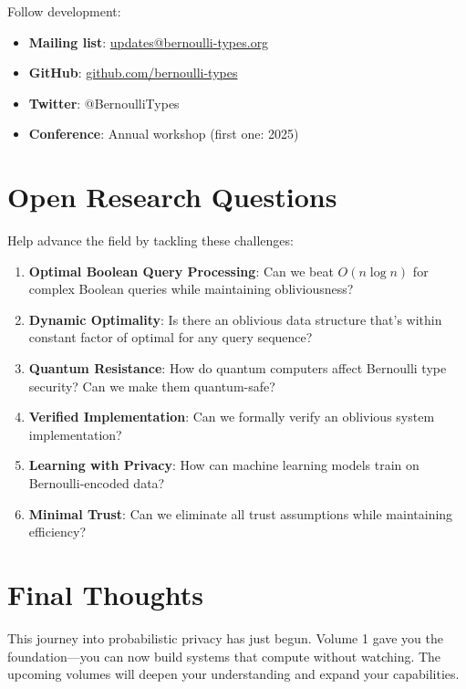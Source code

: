 Follow development:
\begin{itemize}
\item \textbf{Mailing list}: \url{updates@bernoulli-types.org}
\item \textbf{GitHub}: \url{github.com/bernoulli-types}
\item \textbf{Twitter}: @BernoulliTypes
\item \textbf{Conference}: Annual workshop (first one: 2025)
\end{itemize}

\section{Open Research Questions}

Help advance the field by tackling these challenges:

\begin{enumerate}
\item \textbf{Optimal Boolean Query Processing}: Can we beat $O(n \log n)$ for complex Boolean queries while maintaining obliviousness?

\item \textbf{Dynamic Optimality}: Is there an oblivious data structure that's within constant factor of optimal for any query sequence?

\item \textbf{Quantum Resistance}: How do quantum computers affect Bernoulli type security? Can we make them quantum-safe?

\item \textbf{Verified Implementation}: Can we formally verify an oblivious system implementation?

\item \textbf{Learning with Privacy}: How can machine learning models train on Bernoulli-encoded data?

\item \textbf{Minimal Trust}: Can we eliminate all trust assumptions while maintaining efficiency?
\end{enumerate}

\section{Final Thoughts}

This journey into probabilistic privacy has just begun. Volume 1 gave you the foundation—you can now build systems that compute without watching. The upcoming volumes will deepen your understanding and expand your capabilities.

